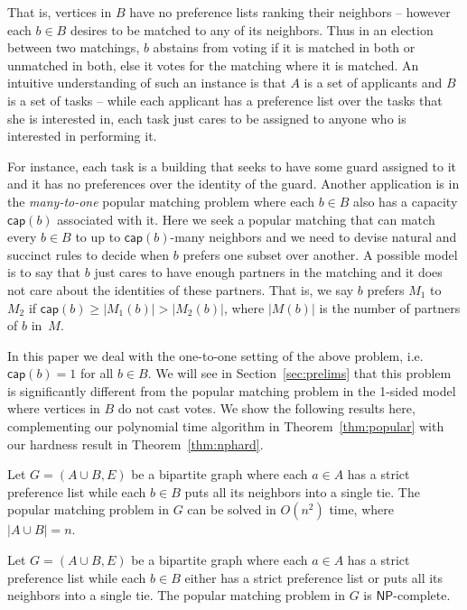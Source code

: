 \documentclass[11pt]{llncs}
\newcommand{\capac}{\mathsf{cap}}
\begin{document}
That is, vertices in $B$ have no preference lists ranking their neighbors -- however each 
$b \in B$ desires to be matched to any of its neighbors. Thus in an election between two 
matchings, $b$ abstains from voting if it is matched in both or unmatched in both, else it 
votes for the matching where it is matched. An intuitive understanding of such an instance 
is that $A$ is a set of applicants and $B$ is a set of tasks -- while each applicant has a 
preference list over the tasks that she is interested in, each task just cares to be assigned 
to anyone who is interested in performing it. 

For instance, each task is a building that seeks to have some guard assigned to it and it has no 
preferences over the identity of the guard. Another application is in the {\em many-to-one} 
popular matching problem  where each $b \in B$ also has a capacity $\capac(b)$ associated with 
it. Here we seek a popular matching that can match every $b \in B$ to up to $\capac(b)$-many 
neighbors and we need to devise natural and succinct rules to decide when $b$ prefers one subset 
over another. A possible model is to say that $b$ just cares to have enough partners in the 
matching and it does not care about the identities of these partners. That is, we say $b$ 
prefers $M_1$ to $M_2$ if $\capac(b) \ge |M_1(b)| > |M_2(b)|$, where $|M(b)|$ is the number of 
partners of $b$ in~$M$. 

In this paper we deal with the one-to-one setting of the above problem, i.e.\ $\capac(b) = 1$
for all $b \in B$. We will see in 
Section~\ref{sec:prelims} that this problem is significantly different 
from the popular matching problem in the 1-sided model where vertices in $B$ do not cast votes.  
We show the following results here, complementing our polynomial time algorithm in 
Theorem~\ref{thm:popular} with our hardness result in Theorem~\ref{thm:nphard}.

\begin{theorem}
\label{thm:popular}
Let $G = (A\cup B,E)$ be a bipartite graph where each $a \in A$ has a strict preference list 
while each $b \in B$ puts all its neighbors into a single tie. The popular 
matching problem in $G$ can be solved in $O(n^2)$ time, where $|A\cup B| = n$.
\end{theorem}

\begin{theorem}
\label{thm:nphard}
Let $G = (A\cup B,E)$ be a bipartite graph where each $a \in A$ has a strict preference list 
while each $b \in B$ either has a strict preference list or puts all its neighbors into a single 
tie. The popular matching problem in $G$ is $\mathsf{NP}$-complete. 
\end{theorem}
 
\end{document}
